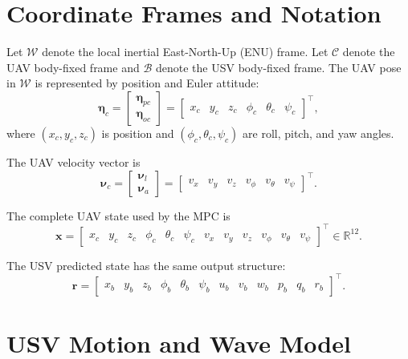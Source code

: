 \documentclass[12pt,a4paper]{article}
\begin{document}
\section{Coordinate Frames and Notation}

Let $\mathcal{W}$ denote the local inertial East-North-Up (ENU) frame. Let $\mathcal{C}$ denote the UAV body-fixed frame and $\mathcal{B}$ denote the USV body-fixed frame. The UAV pose in $\mathcal{W}$ is represented by position and Euler attitude:
\begin{equation}
\bm{\eta}_c =
\begin{bmatrix}
\bm{\eta}_{pc}\\
\bm{\eta}_{oc}
\end{bmatrix}
=
\begin{bmatrix}
x_c & y_c & z_c & \phi_c & \theta_c & \psi_c
\end{bmatrix}^{\top},
\end{equation}
where $(x_c,y_c,z_c)$ is position and $(\phi_c,\theta_c,\psi_c)$ are roll, pitch, and yaw angles.

The UAV velocity vector is
\begin{equation}
\bm{\nu}_c =
\begin{bmatrix}
\bm{\nu}_l\\
\bm{\nu}_a
\end{bmatrix}
=
\begin{bmatrix}
v_x & v_y & v_z & v_\phi & v_\theta & v_\psi
\end{bmatrix}^{\top}.
\end{equation}

The complete UAV state used by the MPC is
\begin{equation}
\bm{x} =
\begin{bmatrix}
x_c & y_c & z_c & \phi_c & \theta_c & \psi_c &
v_x & v_y & v_z & v_\phi & v_\theta & v_\psi
\end{bmatrix}^{\top} \in \mathbb{R}^{12}.
\label{eq:uav_state}
\end{equation}

The USV predicted state has the same output structure:
\begin{equation}
\bm{r} =
\begin{bmatrix}
x_b & y_b & z_b & \phi_b & \theta_b & \psi_b &
u_b & v_b & w_b & p_b & q_b & r_b
\end{bmatrix}^{\top}.
\end{equation}

\section{USV Motion and Wave Model}
\end{document}
